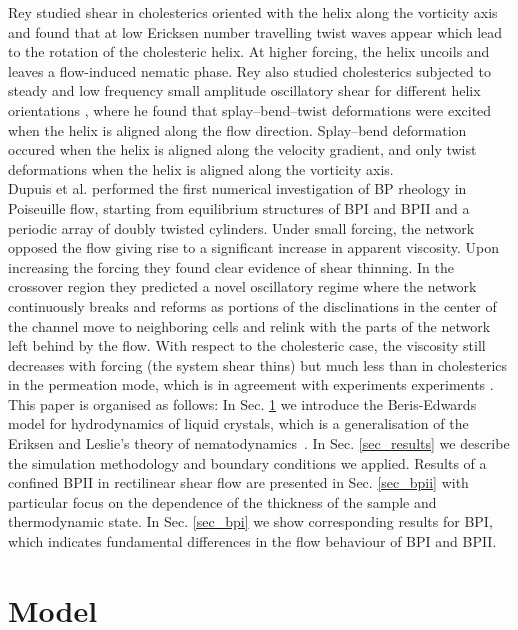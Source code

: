 \documentclass[12pt,twoside]{iopart}
\begin{document}
Rey \cite{Rey:1996a, Rey:1996b} studied shear in cholesterics oriented with the helix along the vorticity axis and found that at low Ericksen number travelling twist waves appear which lead to the rotation of the cholesteric helix. At higher forcing, the helix uncoils and leaves a flow-induced nematic phase. 
Rey also studied cholesterics subjected to steady and low frequency small amplitude oscillatory shear for different helix orientations \cite{Rey:2000, Rey:2002}, where he found that splay–bend–twist deformations were excited when the helix is aligned along the flow direction. Splay–bend deformation occured when the helix is aligned along the velocity gradient, and only twist deformations when the helix is aligned along the vorticity axis. \\
Dupuis et al. \cite{Dupuis:2005} performed the first numerical investigation of BP rheology in Poiseuille flow, starting from equilibrium structures of BPI and BPII and a periodic array of doubly twisted cylinders.
Under small forcing, the network opposed the flow giving rise to a significant increase in apparent viscosity.
Upon increasing the forcing they found clear evidence of shear thinning.
In the crossover region they predicted a novel oscillatory regime where the network continuously breaks and reforms as portions of the disclinations in the center of the channel move to neighboring cells and relink with the parts of the network left behind by the flow. With respect to the cholesteric case, the viscosity still decreases with forcing (the system shear thins) but much less than in cholesterics in the permeation mode, which is in agreement with experiments experiments \cite{Zapotocky:1999, Ramos:2002}.\\
This paper is organised as follows: 
In Sec. \ref{sec_model} we introduce the Beris-Edwards model for hydrodynamics of liquid crystals, which is a generalisation of the Eriksen and Leslie's theory of nematodynamics~\cite{deGennes}.
In Sec. \ref{sec_results} we describe the simulation methodology and boundary conditions we applied.
Results of a confined BPII in rectilinear shear flow are presented in Sec. \ref{sec_bpii} with particular focus on the dependence of the thickness of the sample and thermodynamic state.
In Sec. \ref{sec_bpi} we show corresponding results for BPI, which indicates fundamental differences in the flow behaviour of BPI and BPII. 

\section{Model}\label{sec_model}
\end{document}
